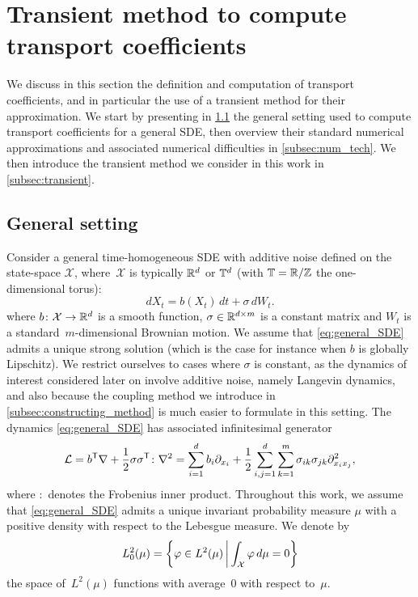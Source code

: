 \section{Transient method to compute transport coefficients}
\label{sec:trans_coeff}
%
We discuss in this section the definition and computation of transport coefficients, and in particular the use of a transient method for their approximation. We start by presenting in \cref{subsec:gen_setting} the general setting used to compute transport coefficients for a general SDE, then overview their standard numerical approximations and associated numerical difficulties in \cref{subsec:num_tech}. We then introduce the transient method we consider in this work in \cref{subsec:transient}.

\subsection{General setting}
\label{subsec:gen_setting}
%
Consider a general time-homogeneous SDE with additive noise defined on the state-space $\mathcal{X}$, where~$\mathcal{X}$ is typically $\mathbb{R}^d$ or $\mathbb{T}^d$ (with $\mathbb{T} = \mathbb{R}/\mathbb{Z}$ the one-dimensional torus):
%
\begin{equation}
    dX_t = b(X_t) \, dt + \sigma \, dW_t.
    \label{eq:general_SDE}
\end{equation}
%
where $b\colon \mathcal{X} \to \mathbb{R}^d$ is a smooth function, $\sigma \in \mathbb{R}^{d\times m}$ is a constant matrix and $W_t$ is a standard~$m$-dimensional Brownian motion. We assume that \eqref{eq:general_SDE} admits a unique strong solution (which is the case for instance when $b$ is globally Lipschitz). We restrict ourselves to cases where $\sigma$ is constant, as the dynamics of interest considered later on involve additive noise, namely Langevin dynamics, and also because the coupling method we introduce in \cref{subsec:constructing_method} is much easier to formulate in this setting. The dynamics \eqref{eq:general_SDE} has associated infinitesimal generator
%
\begin{equation}
    \mathcal{L} = b^\mathsf T\nabla + \frac{1}{2}\sigma\sigma^\mathsf T \colon \nabla^2 = \sum_{i=1}^d b_i\partial_{x_i} + \frac{1}{2}\sum_{i,j=1}^d\sum_{k=1}^m \sigma_{ik}\sigma_{jk} \partial_{x_ix_j}^2,
    \label{eq:general_generator}
\end{equation}
%
where $\colon$ denotes the Frobenius inner product. Throughout this work, we assume that \eqref{eq:general_SDE} admits a unique invariant probability measure $\mu$ with a positive density with respect to the Lebesgue measure. 
We denote by 
\[
L^2_0(\mu) = \left\{\varphi \in L^2(\mu) \, \middle| \, \int_{\mathcal{X}} \varphi \, d\mu = 0\right\}
\]
the space of~$L^2(\mu)$ functions with average~0 with respect to~$\mu$.

